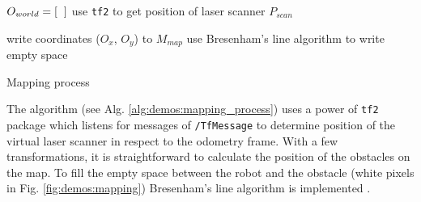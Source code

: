 \vspace*{.4cm}
\begin{algorithm}[H]

$ O_{world} = [\hspace{2mm}] $ 
use \texttt{tf2} to get position of laser scanner $ P_{scan} $\;


write coordinates ($O_{x}$, $O_{y}$) to $ M_{map} $\;
use Bresenham's line algorithm to write empty space\;

\caption{Mapping process}
\label{alg:demos:mapping_process}
\end{algorithm}
\vspace*{.4cm}

The algorithm (see Alg. \ref{alg:demos:mapping_process}) uses a power of \texttt{tf2} package which listens for messages of \texttt{/TfMessage} to determine position of the virtual laser scanner in respect to the odometry frame.
With a few transformations, it is straightforward to calculate the position of the obstacles on the map.
To fill the empty space between the robot and the obstacle (white pixels in Fig. \ref{fig:demos:mapping}) Bresenham's line algorithm is implemented \cite{borenstein_measurement_1996}.

